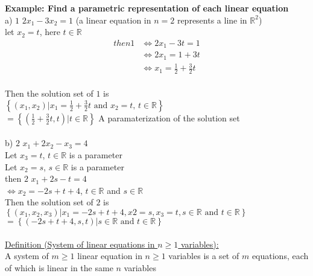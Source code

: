 \documentclass{jhwhw}
\begin{document}
\textbf{Example: Find a parametric representation of each linear equation}
\\

a) \(\boxed{1}\) \(2x_1 - 3x_2 = 1\) (a linear equation in \(n=2\) represents a line in \(\mathbb{R} ^2\))
\\
let \(x_2=t\), here \(t \in \mathbb{R}\)
\\

\begin{align*} 
then \boxed{1} &\Leftrightarrow 2x_1 - 3t = 1 \\
&\Leftrightarrow 2x_1 = 1 + 3t \\
&\Leftrightarrow x_1 = \frac{1}{2} + \frac{3}{2}t \\
\end{align*}

Then the solution set of \(\boxed{1}\) is 
\\
\(\left\{(x_1 , x_2) | x_1 = \frac{1}{2} + \frac{3}{2}t \text{ and } x_2 = t \text{, } t \in \mathbb{R} \right\}\)
\\
\(\boxed{= \left\{\left(\frac{1}{2} + \frac{3}{2}t, t\right) | t \in \mathbb{R} \right\}}\) A paramaterization of the solution set
\\ \\

b) \(\boxed{2}\) \(x_1 + 2x_2 - x_3 = 4\)
\\
Let \(x_3 = t\), \(t \in \mathbb{R}\) is a parameter
\\
Let \(x_2 = s\), \(s \in \mathbb{R}\) is a parameter
\\

then \(\boxed{2}\) \(x_1 + 2s - t = 4\) \\
\(\Leftrightarrow x_2 = -2s + t + 4\), \(t \in \mathbb{R}\) and \(s \in \mathbb{R}\)
\\
Then the solution set of \(\boxed{2}\) is
\\

\(\left\{(x_1, x_2, x_3) | x_1 = -2s + t + 4, x2 = s, x_3 = t, s \in \mathbb{R} \text{ and } t \in \mathbb{R} \right\}\)
\\
\(\boxed{= \left\{(-2s + t + 4, s, t) | s \in \mathbb{R} \text{ and } t \in \mathbb{R} \right\}}\)
\\ \\

\underline{Definition (System of linear equations in \(n \geq 1\) variables):}
\\

A system of \(m \geq 1\) linear equation in \(n \geq 1\) variables is a set of \(m\) equations, each of which is linear in the same \(n\) variables
\\
\end{document}
